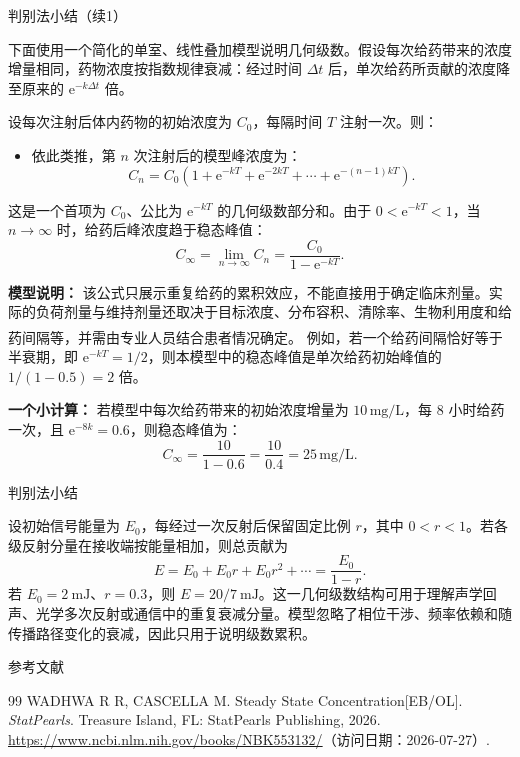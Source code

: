 \documentclass[aspectratio=169,10pt,fontset=fandol]{ctexbeamer}
\newcommand{\ee}{\mathrm{e}}
\newcommand{\upcite}[1]{\textsuperscript{\textsuperscript{\cite{#1}}}}
\begin{document}
\begin{frame}[t,fragile]{判别法小结（续1）}
\footnotesize
{\footnotesize
\begin{application}

下面使用一个简化的单室、线性叠加模型说明几何级数。假设每次给药带来的浓度增量相同，药物浓度按指数规律衰减：经过时间 \(\Delta t\) 后，单次给药所贡献的浓度降至原来的 \(\ee^{-k\Delta t}\) 倍。

设每次注射后体内药物的初始浓度为 \(C_0\)，每隔时间 \(T\) 注射一次。则：
\begin{itemize}

\item 依此类推，第 \(n\) 次注射后的模型峰浓度为：
\[
C_n=C_0\left(1+\ee^{-kT}+\ee^{-2kT}+\cdots+\ee^{-(n-1)kT}\right).
\]
\end{itemize}

这是一个首项为 \(C_0\)、公比为 \(\ee^{-kT}\) 的几何级数部分和。由于 \(0<\ee^{-kT}<1\)，当 \(n\to\infty\) 时，给药后峰浓度趋于稳态峰值：
\[
C_{\infty}=\lim_{n\to\infty}C_n=\frac{C_0}{1-\ee^{-kT}}.
\]

\textbf{模型说明：} 该公式只展示重复给药的累积效应，不能直接用于确定临床剂量。实际的负荷剂量与维持剂量还取决于目标浓度、分布容积、清除率、生物利用度和给药间隔等，并需由专业人员结合患者情况确定。\upcite{NCBISteadyState} 例如，若一个给药间隔恰好等于半衰期，即 \(\ee^{-kT}=1/2\)，则本模型中的稳态峰值是单次给药初始峰值的 \(1/(1-0.5)=2\) 倍。

\textbf{一个小计算：} 若模型中每次给药带来的初始浓度增量为 \(10\,\text{mg/L}\)，每 8 小时给药一次，且 \(\ee^{-8k}=0.6\)，则稳态峰值为：
\[
C_{\infty} = \frac{10}{1 - 0.6} = \frac{10}{0.4} = 25\,\text{mg/L}.
\]
\end{application}
}
\end{frame}
\begin{frame}[t,fragile]{判别法小结}
\normalsize
{\normalsize
\begin{application}[工程：多次反射与信号衰减]
设初始信号能量为 $E_0$，每经过一次反射后保留固定比例 $r$，其中 $0<r<1$。若各级反射分量在接收端按能量相加，则总贡献为
\[
E=E_0+E_0r+E_0r^2+\cdots
=\frac{E_0}{1-r}.
\]
若 $E_0=2\ \mathrm{mJ}$、$r=0.3$，则 $E=20/7\ \mathrm{mJ}$。这一几何级数结构可用于理解声学回声、光学多次反射或通信中的重复衰减分量。模型忽略了相位干涉、频率依赖和随传播路径变化的衰减，因此只用于说明级数累积。
\end{application}
}
\end{frame}
\begin{frame}[t,fragile]{参考文献}
\normalsize
{\normalsize
\begin{thebibliography}{99}
 WADHWA R R, CASCELLA M. Steady State Concentration[EB/OL]. \emph{StatPearls}. Treasure Island, FL: StatPearls Publishing, 2026. \url{https://www.ncbi.nlm.nih.gov/books/NBK553132/}（访问日期：2026-07-27）.
\end{thebibliography}
}
\end{frame}
\end{document}
